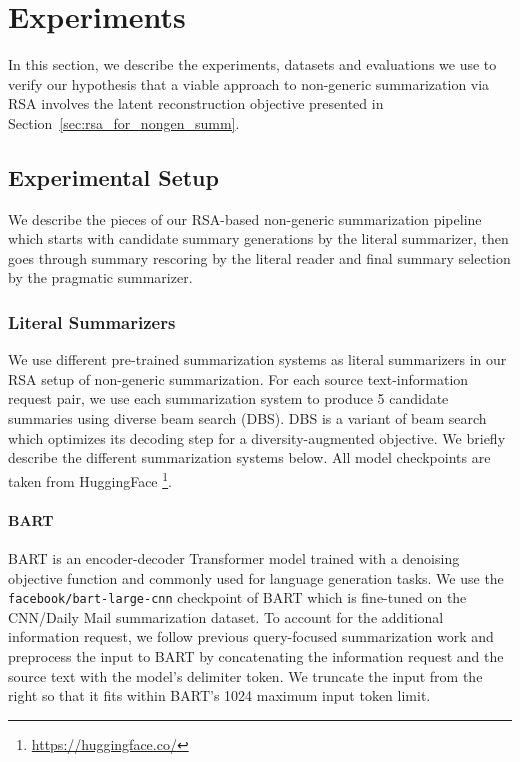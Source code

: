 \documentclass[11pt]{article}
\begin{document}
\section{Experiments}

In this section, we describe the experiments, datasets and evaluations we use to verify our hypothesis that a viable approach to non-generic summarization via RSA involves the latent reconstruction objective presented in Section~\ref{sec:rsa_for_nongen_summ}.

\subsection{Experimental Setup}

We describe the pieces of our RSA-based non-generic summarization pipeline which starts with candidate summary generations by the literal summarizer, then goes through summary rescoring by the literal reader and final summary selection by the pragmatic summarizer.

\subsubsection{Literal Summarizers}

We use different pre-trained summarization systems as literal summarizers in our RSA setup of non-generic summarization. For each source text-information request pair, we use each summarization system to produce 5 candidate summaries using diverse beam search \citep{diverse_beam_search} (DBS). DBS is a variant of beam search which optimizes its decoding step for a diversity-augmented objective. We briefly describe the different summarization systems below. All model checkpoints are taken from HuggingFace \footnote{\url{https://huggingface.co/}}.

\paragraph{BART} BART \citep{bart_model} is an encoder-decoder Transformer model trained with a denoising objective function and commonly used for language generation tasks. We use the \texttt{facebook/bart-large-cnn} checkpoint of BART which is fine-tuned on the CNN/Daily Mail summarization dataset. To account for the additional information request, we follow previous query-focused summarization work \citep{vigExploringNeuralModels2022} and preprocess the input to BART by concatenating the information request and the source text with the model's delimiter token. We truncate the input from the right so that it fits within BART's 1024 maximum input token limit.
\end{document}
